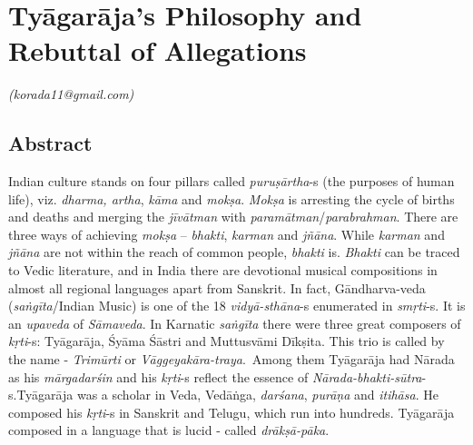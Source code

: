 
\chapter{Tyāgarāja’s Philosophy and Rebuttal of Allegations}\label{chapter3}


\vspace{-.3cm}


\begin{flushright}
\textit{(korada11@gmail.com)}
\end{flushright}


\section*{Abstract}

Indian culture stands on four pillars called \textit{puruṣārtha}-s (the purposes of human life), viz. \textit{dharma, artha}, \textit{kāma} and \textit{mokṣa}. \textit{Mokṣa} is arresting the cycle of births and deaths and merging the \textit{jīvātman} with \textit{paramātman}/\textit{parabrahman}. There are three ways of achieving \textit{mokṣa} – \textit{bhakti}, \textit{karman} and \textit{jñāna}. While \textit{karman} and \textit{jñāna} are not within the reach of common people, \textit{bhakti} is. \textit{Bhakti} can be traced to Vedic literature, and in India there are devotional musical compositions in almost all regional languages apart from Sanskrit. In fact, Gāndharva-veda (\textit{saṅgīta}/Indian Music) is one of the 18 \textit{vidyā-sthāna}-s enumerated in \textit{smṛti}-s. It is an \textit{upaveda} of \textit{Sāmaveda}. In Karnatic \textit{saṅgīta} there were three great composers of \textit{kṛti}-s: Tyāgarāja, Śyāma Śāstri and Muttusvāmi Dīkṣita. This trio is called by the name - \textit{Trimūrti} or \textit{Vāggeyakāra-traya}.~Among them Tyāgarāja had Nārada as his \textit{mārgadarśin} and his \textit{kṛti}-s reflect the essence of \textit{Nārada-bhakti-sūtra}-s.\break Tyāgarāja was a scholar in Veda, Vedāṅga, \textit{darśana}, \textit{purāṇa} and \textit{itihāsa}. He composed his \textit{kṛti}-s in Sanskrit and Telugu, which run into hundreds. Tyāgarāja composed in a language that is lucid - called \textit{drākṣā-pāka}. 

